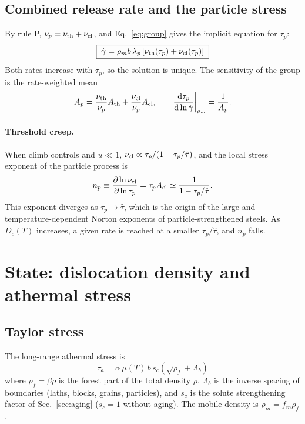 \documentclass[11pt]{article}
\newcommand{\gd}{\dot\gamma}
\newcommand{\dd}{\mathrm{d}}
\numberwithin{equation}{section}
\begin{document}
\subsection{Combined release rate and the particle stress}
By rule P, $\nu_p=\nu_{\rm th}+\nu_{\rm cl}$, and Eq.~\eqref{eq:group} gives the implicit equation for $\tau_p$:
\begin{equation}
\boxed{\;\gd=\rho_m b\,\lambda_p\left[\nu_{\rm th}(\tau_p)+\nu_{\rm cl}(\tau_p)\right]\;}
\label{eq:taup}
\end{equation}
Both rates increase with $\tau_p$, so the solution is unique. The sensitivity of the group is the rate-weighted mean
\begin{equation}
A_p=\frac{\nu_{\rm th}}{\nu_p}A_{\rm th}+\frac{\nu_{\rm cl}}{\nu_p}A_{\rm cl},\qquad \frac{\dd\tau_p}{\dd\ln\gd}\bigg|_{\rho_m}=\frac{1}{A_p}.
\end{equation}

\paragraph{Threshold creep.} When climb controls and $u\ll1$, $\nu_{\rm cl}\propto\tau_p/(1-\tau_p/\hat\tau)$, and the local stress exponent of the particle process is
\begin{equation}
n_p\equiv\frac{\partial\ln\nu_{\rm cl}}{\partial\ln\tau_p}=\tau_pA_{\rm cl}\simeq\frac{1}{1-\tau_p/\hat\tau}.
\end{equation}
This exponent diverges as $\tau_p\to\hat\tau$, which is the origin of the large and temperature-dependent Norton exponents of particle-strengthened steels. As $D_c(T)$ increases, a given rate is reached at a smaller $\tau_p/\hat\tau$, and $n_p$ falls.

\section{State: dislocation density and athermal stress}
\label{sec:state}
\subsection{Taylor stress}
The long-range athermal stress is~\cite{Taylor1934,KocksMecking2003}
\begin{equation}
\boxed{\;\tau_a=\alpha\,\mu(T)\,b\,s_c\left(\sqrt{\rho_f}+\Lambda_b\right)\;}
\label{eq:taua}
\end{equation}
where $\rho_f=\beta\rho$ is the forest part of the total density $\rho$, $\Lambda_b$ is the inverse spacing of boundaries (laths, blocks, grains, particles), and $s_c$ is the solute strengthening factor of Sec.~\ref{sec:aging} ($s_c=1$ without aging). The mobile density is $\rho_m=f_m\rho_f$.
\end{document}
